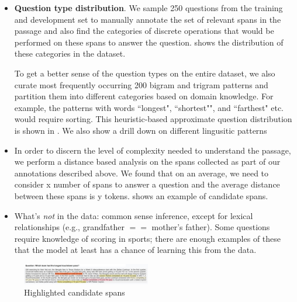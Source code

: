 \begin{itemize}
    \item \textbf{Question type distribution}.
        \subitem We sample 250 questions from the training and development set to manually annotate the set of relevant spans in the passage and also find the categories of discrete operations that would be performed on these spans to answer the question.  shows the distribution of these categories in the dataset.
    
        \subitem To get a better sense of the question types on the entire dataset, we also curate most frequently occurring 200 bigram and trigram patterns and partition them into different categories based on domain knowledge. For example, the patterns with words ``longest", ``shortest"", and ``farthest" etc. would require sorting. This heuristic-based approximate question distribution is shown in . We also show a drill down on different lingusitic patterns
   
   \item In order to discern the level of complexity needed to understand the passage, we perform a distance based analysis on the spans collected as part of our annotations described above. We found that on an average, we need to consider x number of spans to answer a question and the average distance between these spans is y tokens.  shows an example of candidate spans.
  
    \item What's \emph{not} in the data: common sense inference, except for lexical relationships (e.g., grandfather $==$ mother's father).  Some questions require knowledge of scoring in sports; there are enough examples of these that the model at least has a chance of learning this from the data.
\end{itemize}

\begin{figure}
    \centering
    \includegraphics[width=0.5\textwidth]{images/highlight_sort.png}
    \caption{Highlighted candidate spans}
    \label{fig:span_highlight}
\end{figure}
